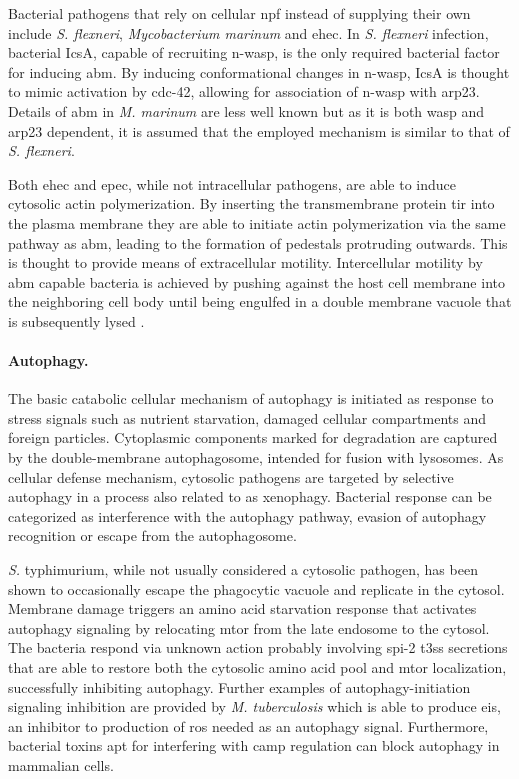 Bacterial pathogens that rely on cellular \gls{npf} instead of supplying their own include \textit{S. flexneri}, \textit{Mycobacterium marinum}  and \gls{ehec}. In \textit{S. flexneri} infection, bacterial IcsA, capable of recruiting \gls{n-wasp}, is the only required bacterial factor for inducing \gls{abm}. By inducing conformational changes in \gls{n-wasp}, IcsA is thought to mimic activation by \gls{cdc-42}, allowing for association of \gls{n-wasp} with \gls{arp23}. Details of \gls{abm} in \textit{M. marinum} are less well known but as it is both \gls{wasp} and \gls{arp23} dependent, it is assumed that the employed mechanism is similar to that of \textit{S. flexneri}.

Both \gls{ehec} and \gls{epec}, while not intracellular pathogens, are able to induce cytosolic actin polymerization. By inserting the transmembrane protein \gls{tir} into the plasma membrane they are able to initiate actin polymerization via the same pathway as \gls{abm}, leading to the formation of pedestals protruding outwards. This is thought to provide means of extracellular motility. Intercellular motility by \gls{abm} capable bacteria is achieved by pushing against the host cell membrane into the neighboring cell body until being engulfed in a double membrane vacuole that is subsequently lysed \citep{Stevens2006,Haglund2011}.

\paragraph{Autophagy.}
The basic catabolic cellular mechanism of autophagy is initiated as response to stress signals such as nutrient starvation, damaged cellular compartments and foreign particles. Cytoplasmic components marked for degradation are captured by the double-membrane autophagosome, intended for fusion with lysosomes. As cellular defense mechanism, cytosolic pathogens are targeted by selective autophagy in a process also related to as xenophagy. Bacterial response can be categorized as interference with the autophagy pathway, evasion of autophagy recognition or escape from the autophagosome.

\textit{S.} typhimurium, while not usually considered a cytosolic pathogen, has been shown to occasionally escape the phagocytic vacuole and replicate in the cytosol. Membrane damage triggers an amino acid starvation response that activates autophagy signaling by relocating \gls{mtor} from the late endosome to the cytosol. The bacteria respond via unknown action probably involving \acrshort{spi}-2 \gls{t3ss} secretions that are able to restore both the cytosolic amino acid pool and \gls{mtor} localization, successfully inhibiting autophagy. Further examples of autophagy-initiation signaling inhibition are provided by \textit{M. tuberculosis} which is able to produce \gls{eis}, an inhibitor to production of \gls{ros} needed as an autophagy signal. Furthermore, bacterial toxins apt for interfering with \gls{camp} regulation can block autophagy in mammalian cells.

